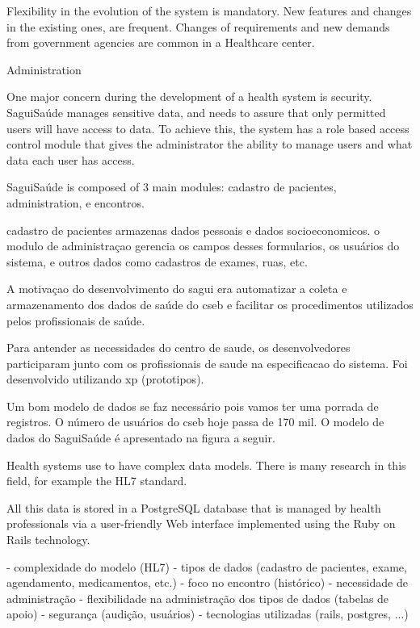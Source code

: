 \documentclass[12pt]{article}
\begin{document}
Flexibility in the evolution of the system is mandatory. New features and changes in the existing ones, are frequent. Changes of requirements and new demands from government agencies are common in a Healthcare center. 



Administration

One major concern during the development of a health system is security. SaguiSaúde manages sensitive data, and needs to assure that only permitted users will have access to data. To achieve this, the system has a role based access control module that gives the administrator the ability to manage users and what data each user has access.


SaguiSaúde is composed of 3 main modules: cadastro de pacientes, administration, e encontros.

cadastro de pacientes armazenas dados pessoais e dados socioeconomicos.
o modulo de administraçao gerencia os campos desses formularios, os usuários do sistema, e outros dados como cadastros de exames, ruas, etc.

A motivaçao do desenvolvimento do sagui era automatizar a coleta e armazenamento dos dados de saúde do cseb e facilitar os procedimentos utilizados pelos profissionais de saúde. 

Para antender as necessidades do centro de saude, os desenvolvedores participaram junto com os profissionais de saude na especificacao do sistema. Foi desenvolvido utilizando xp (prototipos).


Um bom modelo de dados se faz necessário pois vamos ter uma porrada de registros. O número de usuários do cseb hoje passa de 170 mil. O modelo de dados do SaguiSaúde é apresentado na figura a seguir.



Health systems use to have complex data models. There is many research in this field, for example the HL7 standard.  


All this data is stored in a PostgreSQL database that is managed by health professionals via a user-friendly Web interface implemented using the Ruby on Rails technology.



- complexidade do modelo (HL7)
- tipos de dados (cadastro de pacientes, exame, agendamento, medicamentos, etc.)
- foco no encontro (histórico)
- necessidade de administração
- flexibilidade na administração dos tipos de dados (tabelas de apoio)
- segurança (audição, usuários)
- tecnologias utilizadas (rails, postgres, ...)
\end{document}
